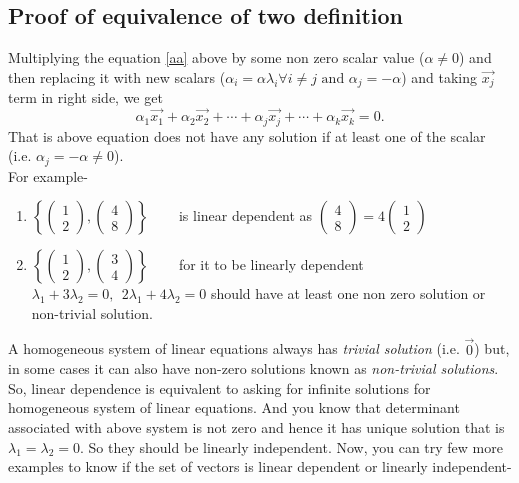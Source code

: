 \documentclass{article}
\begin{document}
\subsection{Proof of equivalence of two definition}
Multiplying the equation \eqref{aa} above by some non zero scalar value ($\alpha\neq 0$) and then replacing it with new scalars ($\alpha_i=\alpha\lambda_i \forall i\neq j\text{ and } \alpha_j = -\alpha$) and taking $\vec{x_j}$ term in right side, we get
\[
    \alpha_1\vec{x_1} + \alpha_2\vec{x_2} + \cdots + \alpha_j\vec{x_j} + \cdots + \alpha_k\vec{x_k} = 0.
\]
That is above equation does not have any solution if at least one of the scalar (i.e. $\alpha_j = -\alpha \neq 0$).\\
For example-
\begin{enumerate}
    \item \(\left\{\begin{pmatrix} 1 \\ 2 \end{pmatrix}, \begin{pmatrix} 4 \\ 8 \end{pmatrix}\right\}\) ~~~  is linear dependent as $\begin{pmatrix} 4 \\ 8 \end{pmatrix} = 4 \begin{pmatrix} 1 \\ 2 \end{pmatrix}$
    \item \(\left\{ \begin{pmatrix} 1 \\ 2 \end{pmatrix}, \begin{pmatrix} 3 \\ 4 \end{pmatrix}\right\}\)
   ~~~ for it to be linearly dependent $\lambda_1 + 3\lambda_2 = 0,~~2\lambda_1 + 4\lambda_2 = 0 $ should have at least one non zero solution or non-trivial solution.
\end{enumerate}
A homogeneous system of linear equations always has \textit{trivial solution} (i.e. $\vec{0}$) but, in some cases it can also have non-zero solutions known as \textit{non-trivial solutions}.\\
So, linear dependence is equivalent to asking for infinite solutions for homogeneous system of linear equations. And you know that determinant associated with above system is not zero and hence it has unique solution that is $\lambda_1 = \lambda_2 = 0$. So they should be linearly independent. Now, you can try few more examples to know if the set of vectors is linear dependent or linearly independent-
\end{document}
